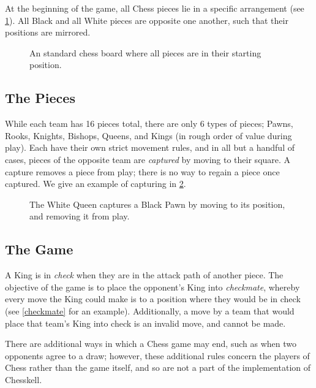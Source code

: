 At the beginning of the game, all Chess pieces lie in a specific arrangement (see \cref{startboard}). All Black and all White pieces are opposite one another, such that their positions are mirrored.

\begin{figure}[h]
    \centering
    \newgame
    \showboard
    \caption{An standard chess board where all pieces are in their starting position.}
    \label{startboard}
\end{figure}

\subsection{The Pieces}

While each team has 16 pieces total, there are only 6 types of pieces; Pawns, Rooks, Knights, Bishops, Queens, and Kings (in rough order of value during play). Each have their own strict movement rules, and in all but a handful of cases, pieces of the opposite team are \emph{captured} by moving to their square. A capture removes a piece from play; there is no way to regain a piece once captured. We give an example of capturing in \cref{capture}.

\begin{figure}[h]
    \centering
    \showboard
    \quad
    \showboard
    \caption{The White Queen captures a Black Pawn by moving to its position, and removing it from play.}
    \label{capture}
\end{figure}

\subsection{The Game}

A King is in \emph{check} when they are in the attack path of another piece. The objective of the game is to place the opponent's King into \emph{checkmate}, whereby every move the King could make is to a position where they would be in check (see \cref{checkmate} for an example). Additionally, a move by a team that would place that team's King into check is an invalid move, and cannot be made.

There are additional ways in which a Chess game may end, such as when two opponents agree to a draw; however, these additional rules concern the players of Chess rather than the game itself, and so are not a part of the implementation of Chesskell.

